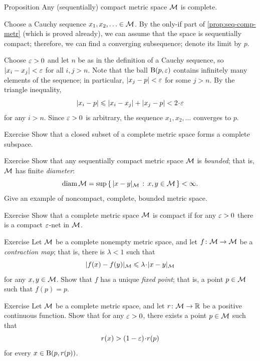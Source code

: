 \begin{thm}{Proposition}\label{prop:compact-complete}
Any (sequentially) compact metric space $\mathcal{M}$ is complete.
\end{thm}

Choose a Cauchy sequence $x_1,x_2,\ldots\in \mathcal{M}$.
By the only-if part of \ref{prop:seq-comp-metr} (which is proved already), we can assume that the space is sequentially compact; therefore, we can find a converging subsequence; denote its limit by $p$.

Choose $\varepsilon>0$ and let $n$ be as in the definition of a Cauchy sequence, so $|x_i-x_j|<\varepsilon$ for all $i,j>n$.
Note that the ball $\mathrm{B}(p,\varepsilon)$ contains infinitely many elements of the sequence; in particular, $|x_j-p|<\varepsilon$ for some $j>n$.
By the triangle inequality,
\[|x_i-p|\le|x_i-x_j| +|x_j-p|<2\cdot \eps\]
for any $i>n$.
Since $\varepsilon>0$ is arbitrary, the sequence $x_1,x_2,\ldots$ converges to $p$.
\qeds

\begin{thm}{Exercise}\label{ex:closed-complete}
Show that a closed subset of a complete metric space forms a complete subspace.
\end{thm}

\begin{thm}{Exercise}\label{ex:compact-complete}
Show that any sequentially compact metric space $\mathcal{M}$ is \emph{bounded};
that is, $\mathcal{M}$ has finite \emph{diameter}:
\[\mathrm{diam}\,\mathcal{M}=\sup\left\{\,{|x-y|_{\mathcal{M}}}\,:\,{x,y\in \mathcal{M}}\,\right\}<\infty.\]
Give an example of noncompact, complete, bounded metric space.

\end{thm}

\begin{thm}{Exercise}\label{ex:compact-net}
Show that a complete metric space $\mathcal{M}$ is compact if for any $\varepsilon>0$ there is a compact $\varepsilon$-net in $\mathcal{M}$.
\end{thm}


\begin{thm}{Exercise}\label{ex:contracction}
Let $\mathcal{M}$ be a complete nonempty metric space, and let
$f\colon\mathcal{M}\to \mathcal{M}$ be a {}\emph{contraction map};
that is, there is $\lambda<1$ such that
\[|f(x)-f(y)|_{\c{M}}\le \lambda\cdot|x-y|_{\c{M}}\]
for any $x,y\in \mathcal{M}$.
Show that $f$ has a unique \emph{fixed point};
that is, a point $p\in\mathcal{M}$ such that $f(p)=p$.
\end{thm}

\begin{thm}{Exercise}\label{ex:alm-min}
Let $\mathcal{M}$ be a complete metric space, and let $r\:\c{M}\z\to \RR$ be a positive continuous function.
Show that for any $\varepsilon>0$, there exists a point $p\in \mathcal{M}$ such that
\[
r(x)> (1-\eps)\cdot r(p)
\]
for every $x\in \mathrm{B} (p, r(p))$.

\end{thm}

